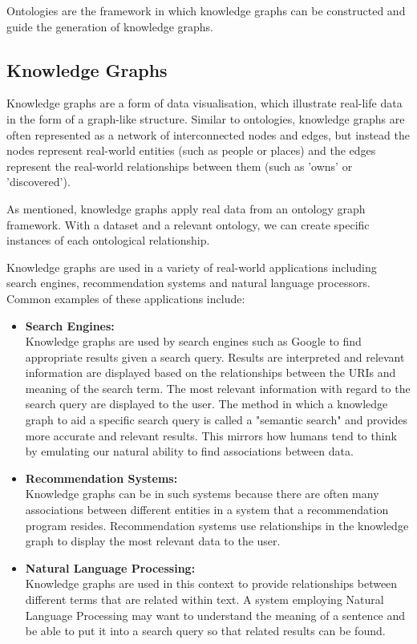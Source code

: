 Ontologies are the framework in which knowledge graphs can be constructed and guide the generation of knowledge graphs. 

\subsection{Knowledge Graphs}
\hspace{0.5cm} Knowledge graphs are a form of data visualisation,  which illustrate real-life data in the form of a graph-like structure. \cite{knowledgegraph} Similar to ontologies, knowledge graphs are often represented as a network of interconnected nodes and edges, but instead the nodes represent real-world entities (such as people or places) and the edges represent the real-world relationships between them (such as 'owns' or 'discovered'). 

As mentioned, knowledge graphs apply real data from an ontology graph framework. With a dataset and a relevant ontology, we can create specific instances of each ontological relationship. 

Knowledge graphs are used in a variety of real-world applications including search engines, recommendation systems and natural language processors. Common examples of these applications include:

\begin{itemize}
\item \textbf{Search Engines:} \\Knowledge graphs are used by search engines such as Google to find appropriate results given a search query. Results are interpreted and relevant information are displayed based on the relationships between the URIs and meaning of the search term. The most relevant information with regard to the search query are displayed to the user. The method in which a knowledge graph to aid a specific search query is called a "semantic search" and provides more accurate and relevant results. This mirrors how humans tend to think by emulating our natural ability to find associations between data.  \cite{searchengine}  

\item \textbf{Recommendation Systems:} \\Knowledge graphs can be in such systems because there are often many associations between different entities in a system that a recommendation program resides. Recommendation systems use relationships in the knowledge graph to display the most relevant data to the user. 

\item \textbf{Natural Language Processing:}\\ Knowledge graphs are used in this context to provide relationships between different terms that are related within text. A system employing Natural Language Processing may want to understand the meaning of a sentence and be able to put it into a search query so that related results can be found. 

\end{itemize}

